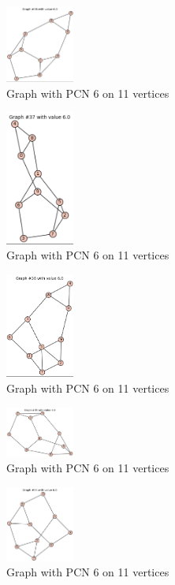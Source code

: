 \documentclass[12pt,a4paper]{amsart}
\theoremstyle{definition}
\theoremstyle{plain}
\begin{document}
\begin{figure}[h]
    \centering
    \includegraphics[width=0.2\textwidth]{Images/6}
    \caption{Graph with PCN 6 on 11 vertices}
\end{figure}
\begin{figure}[h]
    \centering
    \includegraphics[width=0.2\textwidth]{Images/7}
    \caption{Graph with PCN 6 on 11 vertices}
\end{figure}
\begin{figure}[h]
    \centering
    \includegraphics[width=0.2\textwidth]{Images/8}
    \caption{Graph with PCN 6 on 11 vertices}
\end{figure}
\begin{figure}[h]
    \centering
    \includegraphics[width=0.2\textwidth]{Images/9}
    \caption{Graph with PCN 6 on 11 vertices}
\end{figure}
\begin{figure}[h]
    \centering
    \includegraphics[width=0.2\textwidth]{Images/10}
    \caption{Graph with PCN 6 on 11 vertices}
    \end{figure}
\end{document}
